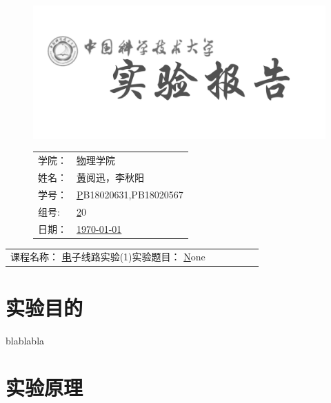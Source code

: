\documentclass[a4paper,11pt,UTF8]{ctexart}
\newcommand{\major}{物理学院}
\newcommand{\name}{黄阅迅，李秋阳}
\newcommand{\stuid}{PB18020631,PB18020567}
\newcommand{\group}{20}
\newcommand{\newdate}{\today}
\newcommand{\course}{电子线路实验(1)}
\newcommand{\newtitle}{None}
\begin{document}
\thispagestyle{empty}
\begin{figure}[h]
  \begin{minipage}{0.6\linewidth}
    \centerline{\includegraphics[width=\linewidth]{logo.png}}
  \end{minipage}
  \hfill
  \begin{minipage}{.4\linewidth}
    \raggedleft
    \begin{tabular*}{.8\linewidth}{ll}
      学院： & \underline\major   \\
      姓名： & \underline\name    \\
      学号： & \underline\stuid   \\
      组号:  & \underline\group   \\
      日期： & \underline\newdate \\
    \end{tabular*}
  \end{minipage}
\end{figure}

\begin{table}[!htbp]
  \centering
  \begin{tabular*}{\linewidth}{llllll}
    课程名称：  \underline\course   \qquad\qquad 实验题目：  \underline\newtitle  
  \end{tabular*}
\end{table}


\section{实验目的}

blablabla

\section{实验原理}
\end{document}
